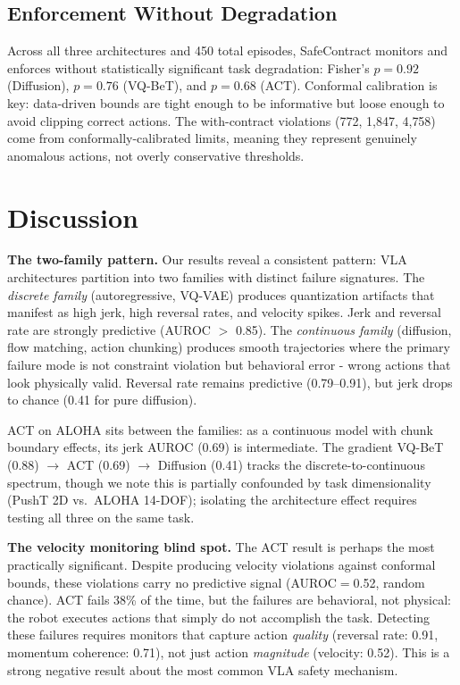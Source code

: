 \documentclass[conference]{IEEEtran}
\begin{document}
\subsection{Enforcement Without Degradation}

Across all three architectures and 450 total episodes, SafeContract monitors and enforces without statistically significant task degradation: Fisher's $p{=}0.92$ (Diffusion), $p{=}0.76$ (VQ-BeT), and $p{=}0.68$ (ACT).
Conformal calibration is key: data-driven bounds are tight enough to be informative but loose enough to avoid clipping correct actions.
The with-contract violations (772, 1{,}847, 4{,}758) come from conformally-calibrated limits, meaning they represent genuinely anomalous actions, not overly conservative thresholds.

\section{Discussion}

\textbf{The two-family pattern.}
Our results reveal a consistent pattern: VLA architectures partition into two families with distinct failure signatures.
The \emph{discrete family} (autoregressive, VQ-VAE) produces quantization artifacts that manifest as high jerk, high reversal rates, and velocity spikes.
Jerk and reversal rate are strongly predictive (AUROC $>$ 0.85).
The \emph{continuous family} (diffusion, flow matching, action chunking) produces smooth trajectories where the primary failure mode is not constraint violation but behavioral error - wrong actions that look physically valid.
Reversal rate remains predictive (0.79--0.91), but jerk drops to chance (0.41 for pure diffusion).

ACT on ALOHA sits between the families: as a continuous model with chunk boundary effects, its jerk AUROC (0.69) is intermediate.
The gradient VQ-BeT (0.88) $\rightarrow$ ACT (0.69) $\rightarrow$ Diffusion (0.41) tracks the discrete-to-continuous spectrum, though we note this is partially confounded by task dimensionality (PushT 2D vs.\ ALOHA 14-DOF); isolating the architecture effect requires testing all three on the same task.

\textbf{The velocity monitoring blind spot.}
The ACT result is perhaps the most practically significant.
Despite producing velocity violations against conformal bounds, these violations carry no predictive signal (AUROC${=}$0.52, random chance).
ACT fails 38\% of the time, but the failures are behavioral, not physical: the robot executes actions that simply do not accomplish the task.
Detecting these failures requires monitors that capture action \emph{quality} (reversal rate: 0.91, momentum coherence: 0.71), not just action \emph{magnitude} (velocity: 0.52).
This is a strong negative result about the most common VLA safety mechanism.
\end{document}
